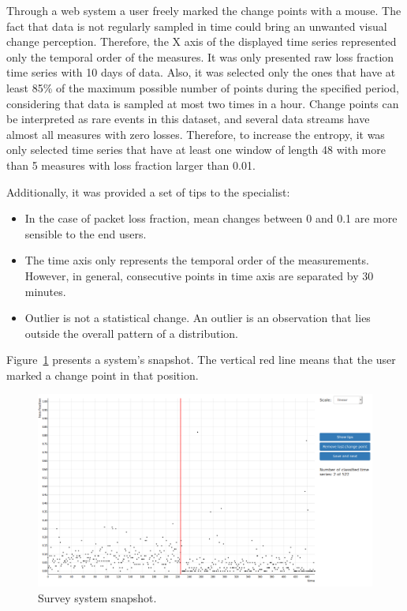 Through a web system a user freely marked the change points with a mouse.
The fact that data is not regularly sampled in time could bring an unwanted
visual change perception. Therefore, the X axis of the displayed time series
represented only the temporal order of the measures.
It was only presented raw
loss fraction time series with 10 days of data.
Also, it was selected only the ones that have at
least 85\% of the maximum possible number of points during the specified period,
considering that data is sampled at most two times in a hour. Change points can
be interpreted as rare events in this dataset, and several data streams have
almost
all measures with zero losses. Therefore, to increase the entropy,
it was only selected time series that have at least one window of length 48 with
more than 5 measures with loss fraction larger than 0.01.

Additionally, it was provided a set of tips to the specialist:

\begin{itemize}
    \item In the case of packet loss fraction, mean changes between 0 and 0.1
    are more sensible to the end users.
    \item The time axis only represents the temporal order of the measurements.
    However, in general, consecutive points in time axis are separated by 30
    minutes.
    \item Outlier is not a statistical change. An outlier is an observation that
    lies outside the overall pattern of a distribution.
\end{itemize}

Figure~\ref{fig:survey_system} presents a system's snapshot.
The vertical red line means that the user marked a change point in that
position.

\begin{figure}[H]
    \centering
    \includegraphics[width=0.9\linewidth]{./figures/methodology/supervised_learning_try/survey_system.png}
    \caption{Survey system snapshot.}
\label{fig:survey_system}
\end{figure}%

